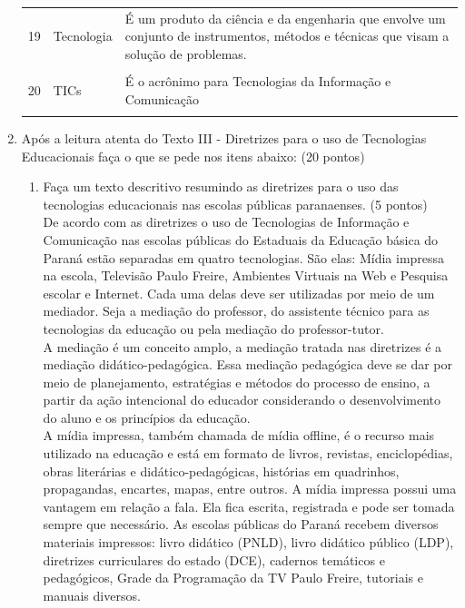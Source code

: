 \documentclass[a4paper, 12pt]{article}
\begin{document}
\begin{enumerate}
\begin{tabular}{|m{0.5cm}|m{5cm}|m{8cm}|}
      \hline
      19 & Tecnologia & É um produto da ciência e da engenharia que envolve um conjunto de instrumentos, métodos e técnicas que visam a solução de problemas. \\ \\
      \hline
      20 & TICs & É o acrônimo para Tecnologias da Informação e Comunicação \\ \\
      \hline
    \end{tabular}
  \item Após a leitura  atenta do Texto III - Diretrizes para o uso de Tecnologias Educacionais faça o que se pede nos itens abaixo: (20 pontos)
    \begin{enumerate}
    \item Faça um texto descritivo  resumindo as diretrizes para o uso das tecnologias educacionais nas escolas públicas paranaenses. (5 pontos) \\
      De acordo com as diretrizes o uso de Tecnologias de Informação e Comunicação nas escolas públicas do Estaduais da Educação básica do Paraná estão separadas em quatro tecnologias. São elas: Mídia impressa na escola, Televisão Paulo Freire, Ambientes Virtuais na Web e Pesquisa escolar e Internet. Cada uma delas deve ser utilizadas por meio de um mediador. Seja a mediação do professor, do assistente técnico para as tecnologias da educação ou pela mediação do professor-tutor. \\
      A mediação é um conceito amplo, a mediação tratada nas diretrizes é a mediação didático-pedagógica. Essa mediação pedagógica deve se dar por meio de planejamento, estratégias e métodos do processo de ensino, a  partir da ação intencional do educador considerando o desenvolvimento do aluno e os princípios da educação. \\
      A mídia impressa, também chamada de mídia offline, é o recurso mais utilizado na educação e está em formato de livros, revistas, enciclopédias, obras literárias e didático-pedagógicas, histórias em quadrinhos, propagandas, encartes, mapas, entre outros. A mídia impressa possui uma vantagem em relação a fala. Ela fica escrita, registrada e pode ser tomada sempre que necessário. As escolas públicas do Paraná recebem diversos materiais impressos: livro didático (PNLD), livro didático público (LDP), diretrizes curriculares do estado (DCE), cadernos temáticos e pedagógicos, Grade da Programação da TV Paulo Freire, tutoriais e manuais diversos. \\

\end{enumerate}
\end{enumerate}
\end{document}
